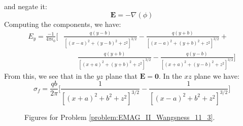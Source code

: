 \begin{solution}
                    and negate it:
                    \begin{equation}
                        \mathbf{E}=\minus\nabla(\phi)
                    \end{equation}
                    Computing the components, we have:
                    \begin{equation}
                        \begin{split}
                            E_{y}=\frac{\minus{1}}{4\pi\epsilon_{0}}\Big[
                                &
                                \frac{q(y-b)}
                                     {[(x-a)^{2}+(y-b)^{2}+z^{2}]^{3/2}}-
                                \frac{q(y+b)}
                                     {[(x-a)^{2}+(y+b)^{2}+z^{2}]^{3/2}}+
                                \\
                                &\quad\quad
                                \frac{q(y+b)}
                                     {[(x+a)^{2}+(y+b)^{2}+z^{2}]^{3/2}}-
                                \frac{q(y-b)}
                                     {[(x+a)^{2}+(y-b)^{2}+z^{2}]^{3/2}}
                            \Big]
                        \end{split}
                    \end{equation}
                    From this, we see that in the $yz$ plane that
                    $\mathbf{E}=\mathbf{0}$. In the $xz$ plane we have:
                    \begin{equation}
                        \sigma_{f}=\frac{qb}{2\pi}\Big[
                            \frac{1}{[(x+a)^{2}+b^{2}+z^{2}]^{3/2}}-
                            \frac{1}{[(x-a)^{2}+b^{2}+z^{2}]^{3/2}}
                        \Big]
                    \end{equation}
                \end{solution}
                \begin{figure}[H]
                    \centering
                    \captionsetup{type=figure}
                    \begin{subfigure}[b]{0.49\textwidth}
                        \centering
                    \end{subfigure}
                    \begin{subfigure}[b]{0.49\textwidth}
                        \centering
                    \end{subfigure}
                    \caption{Figures for Problem
                             \ref{problem:EMAG_II_Wangsness_11_3}.}
                    \label{fig:problem:EMAG_II_Wangsness_11_3}
                \end{figure}
